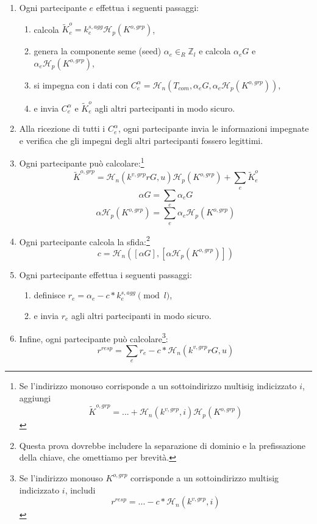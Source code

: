 \begin{enumerate}
    \item Ogni partecipante $e$ effettua i seguenti passaggi:
    \begin{enumerate}
        \item calcola $\tilde{K}^{o}_{e} = k^{s,agg}_e \mathcal{H}_p(K^{o,grp})$,
        \item genera la componente seme (seed) $\alpha_e \in_R \mathbb{Z}_l$ e calcola $\alpha_e G$ e $\alpha_e \mathcal{H}_p(K^{o,grp})$,
        \item si impegna con i dati con $C^{\alpha}_{e} = \mathcal{H}_n(T_{com}, \alpha_e G, \alpha_e \mathcal{H}_p(K^{o,grp}))$,
        \item e invia $C^{\alpha}_{e}$ e $\tilde{K}^{o}_{e}$ agli altri partecipanti in modo sicuro.
    \end{enumerate}
    \item Alla ricezione di tutti i $C^{\alpha}_{e}$, ogni partecipante invia le informazioni impegnate e verifica che gli impegni degli altri partecipanti fossero legittimi.
    \item Ogni partecipante può calcolare:\footnote{Se l'indirizzo monouso corrisponde a un sottoindirizzo multisig indicizzato $i$, aggiungi
    \[\tilde{K}^{o,grp} = ... + \mathcal{H}_n(k^{v,grp},i) \mathcal{H}_p(K^{o,grp})\]}\vspace{.175cm}
    \[\tilde{K}^{o,grp} = \mathcal{H}_n(k^{v,grp} r G, u) \mathcal{H}_p(K^{o,grp}) + \sum_e \tilde{K}^{o}_{e}\]
    \[\alpha G = \sum_e \alpha_{e} G\]
    \[\alpha \mathcal{H}_p(K^{o,grp}) = \sum_e \alpha_{e} \mathcal{H}_p(K^{o,grp})\]
    \item Ogni partecipante calcola la sfida:\footnote{Questa prova dovrebbe includere la separazione di dominio e la prefissazione della chiave, che omettiamo per brevità.}\vspace{.175cm}
    \[c = \mathcal{H}_n([\alpha G],[\alpha \mathcal{H}_p(K^{o,grp})])\]
    \item Ogni partecipante effettua i seguenti passaggi:
    \begin{enumerate}
        \item definisce $r_e = \alpha_e - c*k^{s,agg}_e \pmod l$,
        \item e invia $r_e$ agli altri partecipanti in modo sicuro.
    \end{enumerate}
    \item Infine, ogni partecipante può calcolare\footnote{Se l'indirizzo monouso $K^{o,grp}$ corrisponde a un sottoindirizzo multisig indicizzato $i$, includi
    \[r^{resp} = ... - c*\mathcal{H}_n(k^{v,grp},i)\]}:\vspace{.175cm}
    \[r^{resp} = \sum_e r_e - c*\mathcal{H}_n(k^{v,grp} r G, u)\]
\end{enumerate}

